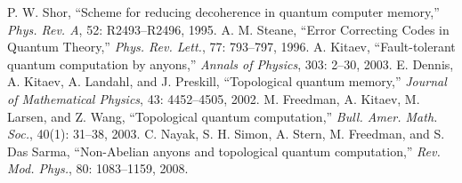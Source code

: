 \documentclass[12pt]{article}
\begin{document}
\begin{thebibliography}{99}
 P. W. Shor, ``Scheme for reducing decoherence in quantum computer memory,'' \emph{Phys. Rev. A}, 52: R2493--R2496, 1995.
 A. M. Steane, ``Error Correcting Codes in Quantum Theory,'' \emph{Phys. Rev. Lett.}, 77: 793--797, 1996.
 A. Kitaev, ``Fault-tolerant quantum computation by anyons,'' \emph{Annals of Physics}, 303: 2--30, 2003.
 E. Dennis, A. Kitaev, A. Landahl, and J. Preskill, ``Topological quantum memory,'' \emph{Journal of Mathematical Physics}, 43: 4452--4505, 2002.
 M. Freedman, A. Kitaev, M. Larsen, and Z. Wang, ``Topological quantum computation,'' \emph{Bull. Amer. Math. Soc.}, 40(1): 31--38, 2003.
 C. Nayak, S. H. Simon, A. Stern, M. Freedman, and S. Das Sarma, ``Non-Abelian anyons and topological quantum computation,'' \emph{Rev. Mod. Phys.}, 80: 1083--1159, 2008.
\end{thebibliography}
\end{document}

